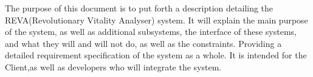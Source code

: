 The purpose of this document is to put forth a description detailing the REVA(Revolutionary Vitality Analyser) system. It will explain the main purpose of the system, as well as additional subsystems, the interface of these systems, and what they will and will not do, as well as the constraints. Providing a detailed requirement specification of the system as a whole. It is intended for the Client,as well as developers who will integrate the system.